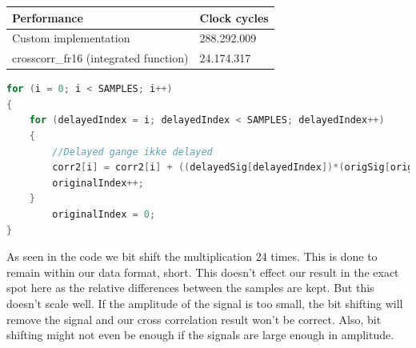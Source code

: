 \begin{table}[H]
\centering
    \begin{tabular}{|l|l|}
    \hline
    Performance                          & Clock cycles \\ \hline
    Custom implementation                & 288.292.009  \\
    crosscorr\_fr16 (integrated function) & 24.174.317   \\ \hline
    \end{tabular}
\end{table}
\begin{lstlisting}[language=C]
for (i = 0; i < SAMPLES; i++)
{
	for (delayedIndex = i; delayedIndex < SAMPLES; delayedIndex++)
	{
		//Delayed gange ikke delayed
    	corr2[i] = corr2[i] + ((delayedSig[delayedIndex])*(origSig[originalIndex]) >> 24);   
    	originalIndex++;
	}
    	originalIndex = 0;
}
\end{lstlisting}

As seen in the code we bit shift the multiplication 24 times. This is done to remain within our data format, short. This doesn't effect our result in the exact spot here as the relative differences between the samples are kept. But this doesn't scale well. If the amplitude of the signal is too small, the bit shifting will remove the signal and our cross correlation result won't be correct. Also, bit shifting might not even be enough if the signals are large enough in amplitude.